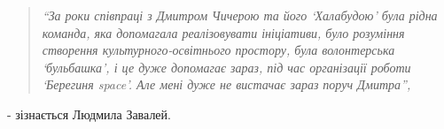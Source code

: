  
 
 
 
 

\begin{quote}
\em\enquote{За роки співпраці з Дмитром Чичерою та його \enquote{Халабудою} була рідна команда,
яка допомагала реалізовувати ініціативи, було розуміння створення
культурного-освітнього простору, була волонтерська \enquote{бульбашка}, і це дуже
допомагає зараз, під час організації роботи \enquote{Берегиня space}. Але  мені дуже не
вистачає зараз поруч Дмитра}, 
\end{quote}
- зізнається Людмила Завалей.

